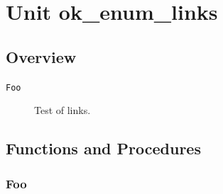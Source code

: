 \documentclass{report}
\begin{document}
\newlength{\tmplength}
\chapter{Unit ok{\_}enum{\_}links}
\section{Overview}
\begin{description}
\item[\texttt{Foo}]Test of links.
\end{description}
\section{Functions and Procedures}
\subsection*{Foo}
\end{document}
